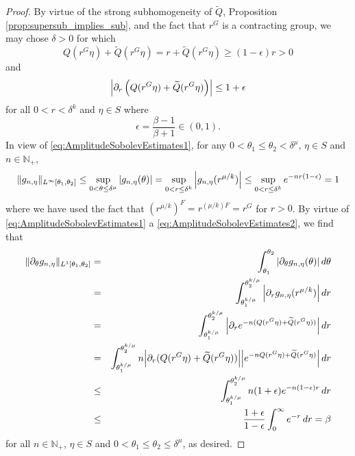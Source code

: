 \documentclass[11pt]{article}
\newcommand{\p}{\partial}
\begin{document}
\begin{proof}
By virtue of the strong subhomogeneity of $\widetilde{Q}$, Proposition \ref{prop:supersub_implies_sub}, and the fact that $r^G$ is a contracting group, we may chose $\delta>0$ for which 
\begin{equation}\label{eq:AmplitudeSobolevEstimates1}
    Q(r^G\eta)+\widetilde{Q}\left(r^G\eta\right)=r+\widetilde{Q}\left(r^G\eta\right)\geq (1-\epsilon)r>0
\end{equation}
and
\begin{equation}\label{eq:AmplitudeSobolevEstimates2}
    \abs{\partial_r\left(Q(r^G\eta)+\widetilde{Q}(r^G\eta)\right)}\leq 1+\epsilon
\end{equation}
for all $0<r<\delta^k$ and $\eta\in S$ where
\begin{equation*}
    \epsilon=\frac{\beta-1}{\beta+1}\in(0,1).
\end{equation*}
In view of \eqref{eq:AmplitudeSobolevEstimates1}, for any $0<\theta_1\leq\theta_2<\delta^{\mu}$, $\eta\in S$ and $n\in\mathbb{N}_+$,
\begin{equation*}
\|g_{n,\eta}\|_{L^\infty[\theta_1,\theta_2]}\leq\sup_{0<\theta\leq\delta^{\mu}}\abs{g_{n,\eta}(\theta)}=\sup_{0<r\leq\delta^k}\abs{g_{n,\eta}(r^{\mu/k})}\leq \sup_{0<r\leq \delta^k}e^{-nr(1-\epsilon)}= 1
\end{equation*}
where we have used the fact that $(r^{\mu/k})^F=r^{(\mu/k)F}=r^G$ for $r>0$. By virtue of \eqref{eq:AmplitudeSobolevEstimates1} a \eqref{eq:AmplitudeSobolevEstimates2}, we find that
\begin{eqnarray*}
\|\partial_{\theta}g_{n,\eta}\|_{L^1[\theta_1,\theta_2]}
&=&\int_{\theta_1}^{\theta_2}\abs{\p_\theta g_{n,\eta}(\theta)}\,d\theta\\
&=&\int_{\theta_1^{k/\mu}}^{\theta_2^{k/\mu}}\abs{\p_r g_{n,\eta}(r^{\mu/k})}\,dr\\
&=&\int_{\theta_1^{k/\mu}}^{\theta_2^{k/\mu}}\abs{\p_r e^{-n(Q(r^G\eta)+\widetilde{Q}(r^G\eta))} }\,dr\\
&=&\int_{\theta_1^{k/\mu}}^{\theta_2^{k/\mu}}n\abs{\partial_r(Q(r^G\eta)+\widetilde{Q}(r^G\eta))}\abs{e^{-nQ(r^G\eta)+\widetilde{Q}(r^G\eta)}}\,dr\\
&\leq&\int_{\theta_1^{k/\mu}}^{\theta_2^{k/\mu}}n(1+\epsilon)e^{-n(1-\epsilon)r}\,dr\\
&\leq &\frac{1+\epsilon}{1-\epsilon}\int_0^\infty e^{-r}\,dr=\beta
\end{eqnarray*}
for all $n\in\mathbb{N}_+$, $\eta\in S$ and $0<\theta_1\leq\theta_2\leq\delta^{\mu}$, as desired.
\end{proof}
\end{document}
